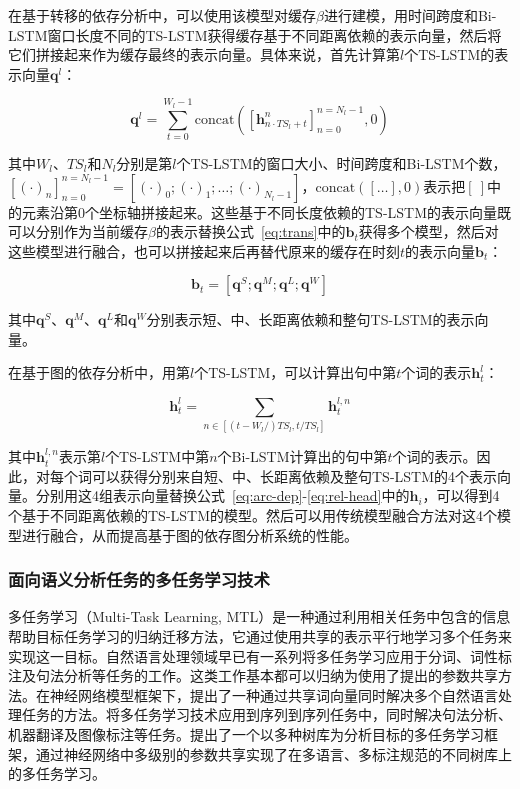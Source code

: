 在基于转移的依存分析中，可以使用该模型对缓存$\beta$进行建模，用时间跨度和Bi-LSTM窗口长度不同的TS-LSTM获得缓存基于不同距离依赖的表示向量，然后将它们拼接起来作为缓存最终的表示向量。具体来说，首先计算第$l$个TS-LSTM的表示向量$\mathbf{q}^l$：

\begin{equation}
\mathbf{q}^l = \sum^{W_l-1}_{t=0} \text{concat}([\mathbf{h}^{n}_{n\cdot TS_l + t}]^{n=N_l-1}_{n=0},0)
\end{equation}

其中$W_l$、$TS_l$和$N_l$分别是第$l$个TS-LSTM的窗口大小、时间跨度和Bi-LSTM个数，$[(\cdot)_n]^{n=N_l-1}_{n=0} = [(\cdot)_0;(\cdot)_1;\dots;(\cdot)_{N_l-1}]$，$\text{concat}([\dots],0)$表示把$[\ ]$中的元素沿第$0$个坐标轴拼接起来。这些基于不同长度依赖的TS-LSTM的表示向量既可以分别作为当前缓存$\beta$的表示替换公式~\ref{eq:trans}中的$\mathbf{b}_t$获得多个模型，然后对这些模型进行融合，也可以拼接起来后再替代原来的缓存在时刻$t$的表示向量$\mathbf{b}_t$：

\begin{equation}
\mathbf{b}_t = [\mathbf{q}^S;\mathbf{q}^M;\mathbf{q}^L;\mathbf{q}^W]
\end{equation}

其中$\mathbf{q}^S$、$\mathbf{q}^M$、$\mathbf{q}^L$和$\mathbf{q}^W$分别表示短、中、长距离依赖和整句TS-LSTM的表示向量。

在基于图的依存分析中，用第$l$个TS-LSTM，可以计算出句中第$t$个词的表示$\mathbf{h}^l_t$：

\begin{equation}
\mathbf{h}^l_t = \sum_{n \in [(t-W_l/)TS_l,t/TS_l]}\mathbf{h}^{l,n}_t
\end{equation}

其中$\mathbf{h}^{l,n}_t$表示第$l$个TS-LSTM中第$n$个Bi-LSTM计算出的句中第$t$个词的表示。因此，对每个词可以获得分别来自短、中、长距离依赖及整句TS-LSTM的4个表示向量。分别用这4组表示向量替换公式~\ref{eq:arc-dep}-\ref{eq:rel-head}中的$\mathbf{h}_i$，可以得到4个基于不同距离依赖的TS-LSTM的模型。然后可以用传统模型融合方法对这4个模型进行融合，从而提高基于图的依存图分析系统的性能。

\subsubsection{面向语义分析任务的多任务学习技术}

多任务学习（Multi-Task Learning, MTL）是一种通过利用相关任务中包含的信息帮助目标任务学习的归纳迁移方法，它通过使用共享的表示平行地学习多个任务来实现这一目标。自然语言处理领域早已有一系列将多任务学习应用于分词、词性标注及句法分析等任务的工作。这类工作基本都可以归纳为使用了提出的参数共享方法。在神经网络模型框架下，提出了一种通过共享词向量同时解决多个自然语言处理任务的方法。将多任务学习技术应用到序列到序列任务中，同时解决句法分析、机器翻译及图像标注等任务。提出了一个以多种树库为分析目标的多任务学习框架，通过神经网络中多级别的参数共享实现了在多语言、多标注规范的不同树库上的多任务学习。

